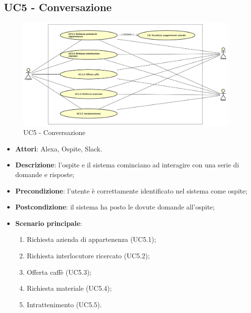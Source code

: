 \documentclass[../AnalisiDeiRequisiti_v4.0.0.tex]{subfiles}
\begin{document}
\subsection{UC5 - Conversazione} 
\label{sssec:UC5}
\begin{figure}[!h]
	\centering
	\includegraphics[width=\textwidth]{UseCases/UC5_Conversazione/UC5_Conversazione.png}
	\caption{UC5 - Conversazione}
\end{figure}
\begin{itemize} 
\item \textbf{Attori}: Alexa, Ospite, Slack.
\item \textbf{Descrizione}: l'ospite e il sistema cominciano ad interagire con una serie di domande e risposte;
\item \textbf{Precondizione}: l'utente è correttamente identificato nel sistema come ospite;
\item \textbf{Postcondizione}: il sistema ha posto le dovute domande all'ospite;
\item \textbf{Scenario principale}: \begin{enumerate}\item Richiesta azienda di appartenenza (UC5.1);\item Richiesta interlocutore ricercato (UC5.2);\item Offerta caffè (UC5.3);\item Richiesta materiale (UC5.4);\item Intrattenimento (UC5.5). 
 \end{enumerate}
\end{itemize} 
\end{document}
